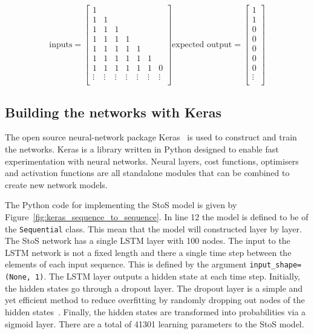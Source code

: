 \begin{equation}\label{eq:sequence_to_probability_inputs_outputs_example}
    \text{inputs} =
    \begin{bmatrix}
        1 &  &  \\
        1 & 1 &  \\
        1 & 1 & 1 \\
        1 & 1 & 1 & 1 \\
        1 & 1 & 1 & 1 & 1 \\
        1 & 1 & 1 & 1 & 1 & 1\\
        1 & 1 & 1 & 1 & 1 & 1 & 0 \\
        \vdots & \vdots & \vdots & \vdots & \vdots & \vdots & \vdots \\
    \end{bmatrix}
    \text{expected output} =
    \begin{bmatrix}
        1 \\
        1 \\
        0 \\
        0 \\
        0 \\
        0 \\
        0 \\
        \vdots \\
    \end{bmatrix}
\end{equation}

\subsection{Building the networks with Keras}

The open source neural-network package Keras~\cite{Chollet2015} is used to
construct and train the networks. Keras is a library written in Python designed
to enable fast experimentation with neural networks. Neural layers, cost
functions, optimisers and activation functions are all standalone modules that
can be combined to create new network models.

The Python code for implementing the StoS model is given by
Figure~\ref{fig:keras_sequence_to_sequence}. In line 12 the model is defined to
be of the \texttt{Sequential} class. This mean that the model will
constructed layer by layer. The StoS network has a single LSTM layer with 100
nodes. The input to the LSTM network is not a fixed length and there a single
time step between the elements of each input sequence. This is defined by the
argument \texttt{input_shape=(None, 1)}. The LSTM layer outputs a
hidden state at each time step. Initially, the hidden states go through a
dropout layer. The dropout layer is a simple and yet efficient method to reduce
overfitting by randomly dropping out nodes of the hidden
states~\cite{Baldi2013}. Finally, the hidden states are transformed into
probabilities via a sigmoid layer. There are a total of 41301 learning
parameters to the StoS model.

